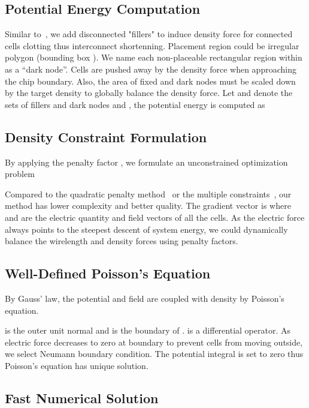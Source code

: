 \documentclass[conference,10pt]{IEEEtran}
\begin{document}
\subsection{Potential Energy Computation}

Similar to~\cite{filler,mpl6}, we add disconnected "fillers" to 
induce density force for connected cells clotting thus 
interconnect shortenning.
Placement region could be irregular polygon 
(bounding box ). 
We name each non-placeable rectangular region within   
as a ``dark node''.
Cells are pushed away by the density force  
when approaching the chip boundary.
Also, the area of fixed and dark nodes
must be scaled down by the target density 
to globally balance the density force.
Let  and  denote the sets of 
fillers and dark nodes and 
, 
the potential energy is computed as




\subsection{Density Constraint Formulation}

By applying the penalty factor , 
we formulate an unconstrained optimization problem 

Compared to the quadratic penalty method~\cite{ntupl3,aplace2} or 
the multiple constraints~\cite{mpl6}, 
our method has lower complexity and better quality. 
The gradient vector is 
 where 
 and  are the electric quantity and 
field vectors of all the cells.
As the electric force always points to the steepest descent 
of system energy, 
we could dynamically balance the wirelength and density forces
using penalty factors.

\subsection{Well-Defined Poisson's Equation}

By Gauss' law, 
the potential and field 
are coupled with density by Poisson's equation.

 is the outer unit normal and 
 is the boundary of . 
 is a differential operator.
As electric force decreases to zero at boundary 
to prevent cells from moving outside, 
we select Neumann boundary condition. 
The potential integral is set to zero 
thus Poisson's equation has unique solution.

\subsection{Fast Numerical Solution}
\end{document}
